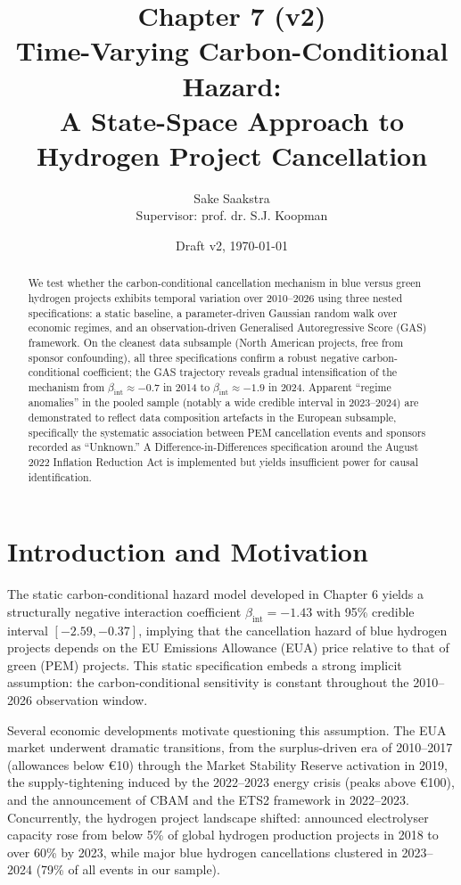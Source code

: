 \documentclass[11pt,a4paper]{article}
\title{\textbf{Chapter 7 (v2)}\\[0.3em] Time-Varying Carbon-Conditional Hazard:\\
A State-Space Approach to Hydrogen Project Cancellation}
\author{Sake Saakstra \\ \small Supervisor: prof. dr. S.J. Koopman}
\date{Draft v2, \today}
\newcommand{\bint}{\beta_{\mathrm{int}}}
\begin{document}
\maketitle

\begin{abstract}
We test whether the carbon-conditional cancellation mechanism in blue versus green hydrogen projects exhibits temporal variation over 2010--2026 using three nested specifications: a static baseline, a parameter-driven Gaussian random walk over economic regimes, and an observation-driven Generalised Autoregressive Score (GAS) framework. On the cleanest data subsample (North American projects, free from sponsor confounding), all three specifications confirm a robust negative carbon-conditional coefficient; the GAS trajectory reveals gradual intensification of the mechanism from $\bint \approx -0.7$ in 2014 to $\bint \approx -1.9$ in 2024. Apparent ``regime anomalies'' in the pooled sample (notably a wide credible interval in 2023--2024) are demonstrated to reflect data composition artefacts in the European subsample, specifically the systematic association between PEM cancellation events and sponsors recorded as ``Unknown.'' A Difference-in-Differences specification around the August 2022 Inflation Reduction Act is implemented but yields insufficient power for causal identification.
\end{abstract}

\section{Introduction and Motivation}
\label{sec:ch7-intro}

The static carbon-conditional hazard model developed in Chapter 6 yields a structurally negative interaction coefficient $\bint = -1.43$ with 95\% credible interval $[-2.59, -0.37]$, implying that the cancellation hazard of blue hydrogen projects depends on the EU Emissions Allowance (EUA) price relative to that of green (PEM) projects. This static specification embeds a strong implicit assumption: the carbon-conditional sensitivity is constant throughout the 2010--2026 observation window.

Several economic developments motivate questioning this assumption. The EUA market underwent dramatic transitions, from the surplus-driven era of 2010--2017 (allowances below \euro 10) through the Market Stability Reserve activation in 2019, the supply-tightening induced by the 2022--2023 energy crisis (peaks above \euro 100), and the announcement of CBAM and the ETS2 framework in 2022--2023. Concurrently, the hydrogen project landscape shifted: announced electrolyser capacity rose from below 5\% of global hydrogen production projects in 2018 to over 60\% by 2023, while major blue hydrogen cancellations clustered in 2023--2024 (79\% of all events in our sample).
\end{document}
